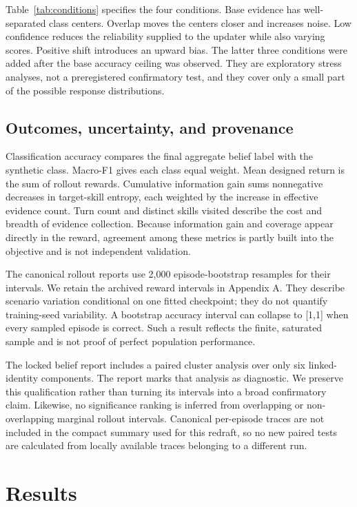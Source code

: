 \documentclass[10pt,a4paper]{article}
\begin{document}
Table~\ref{tab:conditions} specifies the four conditions. Base evidence has well-separated class centers. Overlap moves the centers closer and increases noise. Low confidence reduces the reliability supplied to the updater while also varying scores. Positive shift introduces an upward bias. The latter three conditions were added after the base accuracy ceiling was observed. They are exploratory stress analyses, not a preregistered confirmatory test, and they cover only a small part of the possible response distributions.

\subsection{Outcomes, uncertainty, and provenance}
Classification accuracy compares the final aggregate belief label with the synthetic class. Macro-F1 gives each class equal weight. Mean designed return is the sum of rollout rewards. Cumulative information gain sums nonnegative decreases in target-skill entropy, each weighted by the increase in effective evidence count. Turn count and distinct skills visited describe the cost and breadth of evidence collection. Because information gain and coverage appear directly in the reward, agreement among these metrics is partly built into the objective and is not independent validation.

The canonical rollout reports use 2,000 episode-bootstrap resamples for their intervals. We retain the archived reward intervals in Appendix A. They describe scenario variation conditional on one fitted checkpoint; they do not quantify training-seed variability. A bootstrap accuracy interval can collapse to [1,1] when every sampled episode is correct. Such a result reflects the finite, saturated sample and is not proof of perfect population performance.

The locked belief report includes a paired cluster analysis over only six linked-identity components. The report marks that analysis as diagnostic. We preserve this qualification rather than turning its intervals into a broad confirmatory claim. Likewise, no significance ranking is inferred from overlapping or non-overlapping marginal rollout intervals. Canonical per-episode traces are not included in the compact summary used for this redraft, so no new paired tests are calculated from locally available traces belonging to a different run.

\section{Results}
\end{document}
